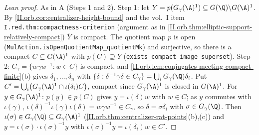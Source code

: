 \begin{proof}[Lean proof]
As in A (Steps 1 and 2). Step 1: let $Y=p(G_\gamma(\A)^1)\subseteq G(\Q)\backslash G(\A)^1$. By \cref{II.orb.cor:centralizer-height-bound} and the vol.~I item \texttt{I.red.thm:compactness-criterion} (argument as in \cref{II.orb.thm:elliptic-support-relatively-compact}) $\overline Y$ is compact. The quotient map $p$ is open (\texttt{MulAction.isOpenQuotientMap\_quotientMk}) and surjective, so there is a compact $C\subseteq G(\A)^1$ with $p(C)\supseteq\overline Y$ (\texttt{exists\_compact\_image\_superset}). Step 2: $C_\gamma=\{w\gamma w^{-1}:w\in C\}$ is compact, and \cref{II.orb.lem:conjugates-meeting-compact-finite}(b) gives $\delta_1,\dots,\delta_n$ with $\{\delta:\delta^{-1}\gamma\delta\in C_\gamma\}=\bigcup_iG_\gamma(\Q)\delta_i$. Put $C'=\bigcup_i\bigl(G_\gamma(\A)^1\cap\iota(\delta_i)C\bigr)$, compact since $G_\gamma(\A)^1$ is closed in $G(\A)^1$. For $y\in G_\gamma(\A)^1$: $p(y)\in p(C)$ gives $y=\iota(\delta)w$ with $w\in C$; as $y$ commutes with $\iota(\gamma)$, $\iota(\delta)^{-1}\iota(\gamma)\iota(\delta)=w\gamma w^{-1}\in C_\gamma$, so $\delta=\sigma\delta_i$ with $\sigma\in G_\gamma(\Q)$. Then $\iota(\sigma)\in G_\gamma(\Q)\subseteq G_\gamma(\A)^1$ (\cref{II.orb.thm:centralizer-rat-points}(b),(c)) and $y=\iota(\sigma)\cdot\iota(\sigma)^{-1}y$ with $\iota(\sigma)^{-1}y=\iota(\delta_i)w\in C'$.
\end{proof}

